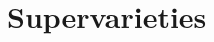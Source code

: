 \documentclass[a4paper,10pt]{scrreprt}
\newcommand{\R}{\mathbb{R}}
\theoremstyle{definition}
\newtheorem{definition}{Definition}[section]
\theoremstyle{plain}
\newtheorem{theorem}{Theorem}[section]
\theoremstyle{remark}
\newtheorem{note}{Note}[section]
\begin{document}
\section{Supervarieties}
%
%
%
%
\end{document}

